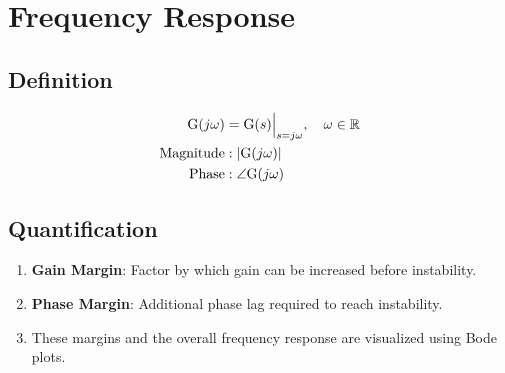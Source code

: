 \section*{Frequency Response}
\subsection*{Definition}
\begin{align*}
    \func{G}[j\omega] &= \func{G}[s]\Big|_{s=j\omega}, \quad \omega \in \mathbb{R} \\
    \text{Magnitude} &: | \func{G}[j\omega] | \\
    \text{Phase} &: \angle \func{G}[j\omega]
\end{align*}

\subsection*{Quantification}
\begin{enumerate}
    \item \textbf{Gain Margin}: Factor by which gain can be increased before instability.
    \item \textbf{Phase Margin}: Additional phase lag required to reach instability.
    \item These margins and the overall frequency response are visualized using Bode plots.
\end{enumerate}